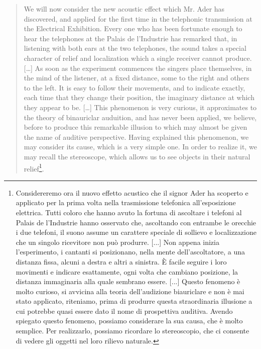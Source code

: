 \begin{quotation}
We will now consider the new acoustic effect which Mr. Ader has discovered, and
applied for the first time in the telephonic transmission at the Electrical
Exhibition. Every one who has been fortunate enough to hear the telephones at
the Palais de l'Industrie has remarked that, in listening with both ears at the
two telephones, the sound takes a special character of relief and localization
which a single receiver cannot produce. [\ldots] As soon as the experiment
commences the singers place themselves, in the mind of the listener, at a fixed
distance, some to the right and others to the left. It is easy to follow their
movements, and to indicate exactly, each time that they change their position,
the imaginary distance at which they appear to be. [\ldots] This phenomenon is
very curious, it approximates to the theory of binauriclar auduition, and has
never been applied, we believe, before to produce this remarkable illusion to
which may almost be given the name of auditive perspective. Having explained
this phenomenon, we may consider its cause, which is a very simple one. In order
to realize it, we may recall the stereoscope, which allows us to see objects in
their natural relief\footnote{Considereremo ora il nuovo effetto acustico che il signor Ader ha scoperto e applicato per la prima volta nella trasmissione telefonica all'esposizione elettrica. Tutti coloro che hanno avuto la fortuna di ascoltare i telefoni al Palais de l'Industrie hanno osservato che, ascoltando con entrambe le orecchie i due telefoni, il suono assume un carattere speciale di sollievo e localizzazione che un singolo ricevitore non può produrre. [...] Non appena inizia l'esperimento, i cantanti si posizionano, nella mente dell'ascoltatore, a una distanza fissa, alcuni a destra e altri a sinistra. È facile seguire i loro movimenti e indicare esattamente, ogni volta che cambiano posizione, la distanza immaginaria alla quale sembrano essere. [...] Questo fenomeno è molto curioso, si avvicina alla teoria dell'audizione biauriclare e non è mai stato applicato, riteniamo, prima di produrre questa straordinaria illusione a cui potrebbe quasi essere dato il nome di prospettiva auditiva. Avendo spiegato questo fenomeno, possiamo considerare la sua causa, che è molto semplice. Per realizzarlo, possiamo ricordare lo stereoscopio, che ci consente di vedere gli oggetti nel loro rilievo naturale.}.
\end{quotation}

